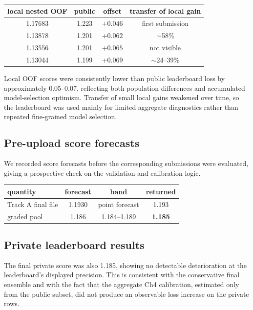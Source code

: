 \documentclass[11pt]{article}
\begin{document}
\begin{center}\small
\begin{tabular}{cccc}
\toprule
local nested OOF & public & offset & transfer of local gain \\
\midrule
1.17683 & 1.223 & $+0.046$ & first submission \\
1.13878 & 1.201 & $+0.062$ & $\sim$58\% \\
1.13556 & 1.201 & $+0.065$ & not visible \\
1.13044 & 1.199 & $+0.069$ & $\sim$24--39\% \\
\bottomrule
\end{tabular}
\end{center}

Local OOF scores were consistently lower than public leaderboard loss by approximately
0.05--0.07, reflecting both population differences and accumulated model-selection
optimism. Transfer of small local gains weakened over time, so the leaderboard was used
mainly for limited aggregate diagnostics rather than repeated fine-grained model
selection.

\subsection{Pre-upload score forecasts}

We recorded score forecasts before the corresponding submissions were evaluated, giving
a prospective check on the validation and calibration logic.

\begin{center}\small
\begin{tabular}{lccc}
\toprule
quantity & forecast & band & returned \\
\midrule
Track A final file & 1.1930 & point forecast & 1.193 \\
graded pool & 1.186 & 1.184--1.189 & \textbf{1.185} \\
\bottomrule
\end{tabular}
\end{center}

\subsection{Private leaderboard results}

The final private score was also 1.185, showing no detectable deterioration at the
leaderboard's displayed precision. This is consistent with the conservative final
ensemble and with the fact that the aggregate Ch4 calibration, estimated only from the
public subset, did not produce an observable loss increase on the private rows.
\end{document}
